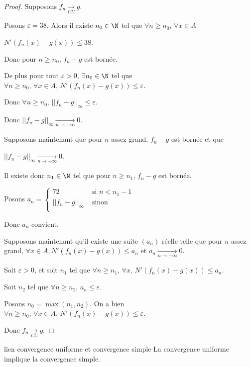 \begin{proof}
    Supposons $f_n \xrightarrow[CU]{} g$.

    Posons $\varepsilon = 38$. Alors il existe $n_0 \in \N$ tel que $\forall n \geqslant n_0, \, \forall x \in A$ 
    
    $N'(f_n(x) - g(x)) \leqslant 38$.

    Donc pour $n \geqslant n_0$, $f_n - g$ est bornée.

    De plus pour tout $\varepsilon >0$, $\exists n_0 \in \N$ tel que $\forall n \geqslant n_0, \, \forall x \in A, \, N'(f_n(x) - g(x)) \leqslant \varepsilon$.

    Donc $\forall n \geqslant n_0, \, || f_n - g ||_{\infty} \leqslant \varepsilon$.

    Donc $\displaystyle || f_n - g ||_{\infty} \xrightarrow[n\to +\infty]{} 0$.

    \lvspace Supposons maintenant que pour $n$ assez grand, $f_n - g$ est bornée et que 
    
    $\displaystyle || f_n - g ||_{\infty} \xrightarrow[n\to +\infty]{} 0$.

    Il existe donc $n_1 \in \N$ tel que pour $n \geqslant n_1$, $f_n - g$ est bornée. 
    
    Posons 
    $a_n = \left\{ \begin{array}{cc}
        72 & \text{ si } n < n_1  - 1\\
        || f_n - g ||_{\infty} & \text{ sinon }\\
    \end{array} \right. $

    Donc $a_n$ convient. 

    \lvspace Supposons maintenant qu'il existe une suite $(a_n)$ réelle telle que pour $n$ assez grand, 
    $\forall x \in A, N'(f_n(x) - g(x)) \leqslant a_n$ et $a_n \xrightarrow[n\to +\infty]{} 0$.

    Soit $\varepsilon > 0$, et soit $n_1$ tel que $\forall n \geqslant n_1, \, \forall x, \, N'(f_n(x) - g(x)) \leqslant a_n$.

    Soit $n_2$ tel que $\forall n \geqslant n_2, \, a_n \leqslant \varepsilon$.

    Posons $n_0 = \max(n_1, n_2)$. On a bien $\forall n \geqslant n_0, \, \forall x \in A, \, N'(f_n(x) - g(x)) \leqslant \varepsilon$.

    Donc $f_n \xrightarrow[CU]{} g$.
\end{proof}

\begin{proposition}{lien convergence uniforme et convergence simple}{}
    La convergence uniforme implique la convergence simple.
\end{proposition}

